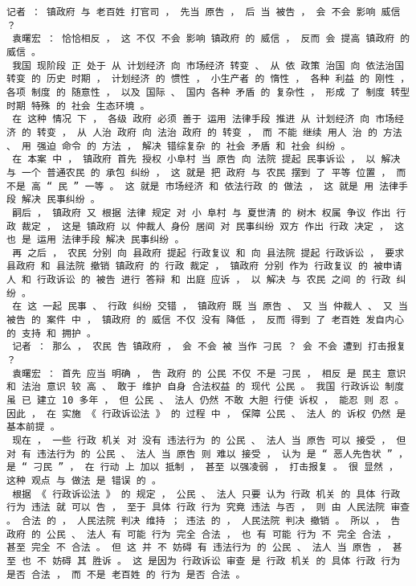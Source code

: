 \documentclass{article}
\begin{document}
\begin{Verbatim}[commandchars=\\\{\}]
 记者 ： 镇政府 与 老百姓 打官司 ， 先当 原告 ， 后 当 被告 ， 会 不会 影响 威信 ？ 
 袁曙宏 ： 恰恰相反 ， 这 不仅 不会 影响 镇政府 的 威信 ， 反而 会 提高 镇政府 的 威信 。 
 我国 现阶段 正 处于 从 计划经济 向 市场经济 转变 、 从 依 政策 治国 向 依法治国 转变 的 历史 时期 ， 计划经济 的 惯性 ， 小生产者 的 惰性 ， 各种 利益 的 刚性 ， 各项 制度 的 随意性 ， 以及 国际 、 国内 各种 矛盾 的 复杂性 ， 形成 了 制度 转型 时期 特殊 的 社会 生态环境 。 
 在 这种 情况 下 ， 各级 政府 必须 善于 运用 法律手段 推进 从 计划经济 向 市场经济 的 转变 ， 从 人治 政府 向 法治 政府 的 转变 ， 而 不能 继续 用人 治 的 方法 、 用 强迫 命令 的 方法 ， 解决 错综复杂 的 社会 矛盾 和 社会 纠纷 。 
 在 本案 中 ， 镇政府 首先 授权 小阜村 当 原告 向 法院 提起 民事诉讼 ， 以 解决 与 一个 普通农民 的 承包 纠纷 ， 这 就是 把 政府 与 农民 摆到 了 平等 位置 ， 而 不是 高 “ 民 ” 一等 。 这 就是 市场经济 和 依法行政 的 做法 ， 这 就是 用 法律手段 解决 民事纠纷 。 
 嗣后 ， 镇政府 又 根据 法律 规定 对 小 阜村 与 夏世清 的 树木 权属 争议 作出 行政 裁定 ， 这是 镇政府 以 仲裁人 身份 居间 对 民事纠纷 双方 作出 行政 决定 ， 这 也 是 运用 法律手段 解决 民事纠纷 。 
 再 之后 ， 农民 分别 向 县政府 提起 行政复议 和 向 县法院 提起 行政诉讼 ， 要求 县政府 和 县法院 撤销 镇政府 的 行政 裁定 ， 镇政府 分别 作为 行政复议 的 被申请人 和 行政诉讼 的 被告 进行 答辩 和 出庭 应诉 ， 以 解决 与 农民 之间 的 行政 纠纷 。 
 在 这 一起 民事 、 行政 纠纷 交错 ， 镇政府 既 当 原告 、 又 当 仲裁人 、 又 当 被告 的 案件 中 ， 镇政府 的 威信 不仅 没有 降低 ， 反而 得到 了 老百姓 发自内心 的 支持 和 拥护 。 
 记者 ： 那么 ， 农民 告 镇政府 ， 会 不会 被 当作 刁民 ？ 会 不会 遭到 打击报复 ？ 
 袁曙宏 ： 首先 应当 明确 ， 告 政府 的 公民 不仅 不是 刁民 ， 相反 是 民主 意识 和 法治 意识 较 高 、 敢于 维护 自身 合法权益 的 现代 公民 。 我国 行政诉讼 制度 虽 已 建立 10 多年 ， 但 公民 、 法人 仍然 不敢 大胆 行使 诉权 ， 能忍 则 忍 。 因此 ， 在 实施 《 行政诉讼法 》 的 过程 中 ， 保障 公民 、 法人 的 诉权 仍然 是 基本前提 。 
 现在 ， 一些 行政 机关 对 没有 违法行为 的 公民 、 法人 当 原告 可以 接受 ， 但 对 有 违法行为 的 公民 、 法人 当 原告 则 难以 接受 ， 认为 是 “ 恶人先告状 ” ， 是 “ 刁民 ” ， 在 行动 上 加以 抵制 ， 甚至 以强凌弱 ， 打击报复 。 很 显然 ， 这种 观点 与 做法 是 错误 的 。 
 根据 《 行政诉讼法 》 的 规定 ， 公民 、 法人 只要 认为 行政 机关 的 具体 行政 行为 违法 就 可以 告 ， 至于 具体 行政 行为 究竟 违法 与否 ， 则 由 人民法院 审查 。 合法 的 ， 人民法院 判决 维持 ； 违法 的 ， 人民法院 判决 撤销 。 所以 ， 告 政府 的 公民 、 法人 有 可能 行为 完全 合法 ， 也 有 可能 行为 不 完全 合法 ， 甚至 完全 不 合法 。 但 这 并 不 妨碍 有 违法行为 的 公民 、 法人 当 原告 ， 甚至 也 不 妨碍 其 胜诉 。 这 是因为 行政诉讼 审查 是 行政 机关 的 具体 行政 行为 是否 合法 ， 而 不是 老百姓 的 行为 是否 合法 。 

\end{Verbatim}
\end{document}
